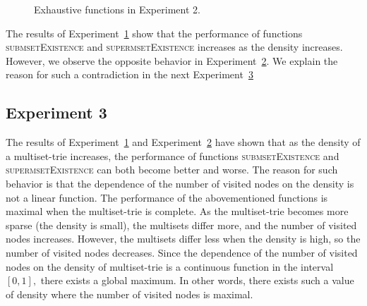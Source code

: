 \documentclass[algorithms,article,accept,pdftex,moreauthors]{Definitions/mdpi}
\begin{document}
\begin{figure}[H]

\caption{Exhaustive functions in Experiment 2.\label{fig:e2m3}}
\end{figure}

The results of Experiment~\hyperref[s:exp1]{1} show that the performance 
of functions \textsc{submsetExistence} and \textsc{supermsetExistence} increases 
as the density increases. However, we observe the opposite behavior in 
Experiment~\hyperref[s:exp2]{2}. We explain the reason for such a contradiction 
in the next Experiment~\hyperref[s:exp3]{3} 


\subsection{Experiment 3} \label{s:exp3}
The results of Experiment~\hyperref[s:exp1]{1} and Experiment~\hyperref[s:exp2]{2} 
have shown that as the density of a multiset-trie increases, the performance of 
functions \textsc{submsetExistence} and \textsc{supermsetExistence} can both become 
better and worse. The reason for such behavior is that the dependence of the 
number of visited nodes on the density is not a linear function. 
The performance of the abovementioned functions is maximal when the multiset-trie is 
complete. As the multiset-trie becomes more sparse (the density is small), the multisets
differ more, and the number of visited nodes increases. However, the multisets differ
less when the density is high, so the number of visited nodes decreases. Since 
the dependence of the number of visited nodes on the density of multiset-trie 
is a continuous function in the interval $[0,1],$ there exists a global maximum. 
In other words, there exists such a value of density where the number of visited 
nodes is maximal. 
\end{document}
